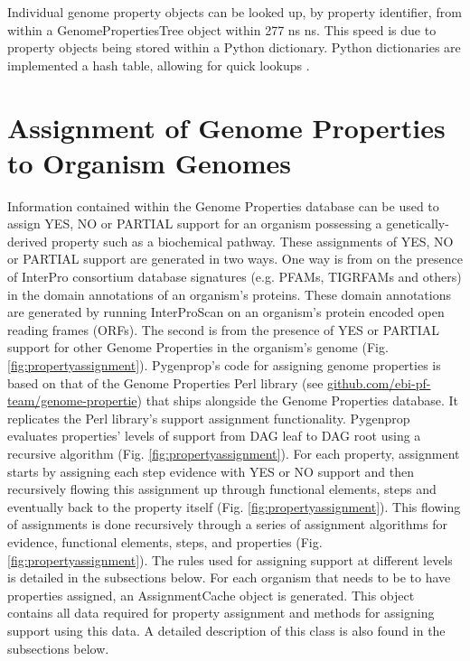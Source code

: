 Individual genome property objects can be looked up, by property identifier, from within a GenomePropertiesTree object within 277 ns  ns. This speed is due to property objects being stored within a Python dictionary. Python dictionaries are implemented a hash table, allowing for quick lookups \cite{van1995python}.

\section{Assignment of Genome Properties to Organism Genomes}

Information contained within the Genome Properties database can be used to assign YES, NO or PARTIAL support for an organism possessing a genetically-derived property such as a biochemical pathway. These assignments of YES, NO or PARTIAL support are generated in two ways. One way is from on the presence of InterPro consortium database signatures (e.g. PFAMs, TIGRFAMs and others) in the domain annotations of an organism's proteins. These domain annotations are generated by running InterProScan \cite{jones2014interproscan} on an organism's protein encoded open reading frames (ORFs). The second is from the presence of YES or PARTIAL support for other Genome Properties in the organism's genome (Fig. \ref{fig:propertyassignment}). Pygenprop's code for assigning genome properties is based on that of the Genome Properties Perl library (see \href{github.com/ebi-pf-team/genome-properties}{github.com/ebi-pf-team/genome-propertie}) that ships alongside the Genome Properties database. It replicates the Perl library's support assignment functionality. Pygenprop evaluates properties' levels of support from DAG leaf to DAG root using a recursive algorithm (Fig. \ref{fig:propertyassignment}). For each property, assignment starts by assigning each step evidence with YES or NO support and then recursively flowing this assignment up through functional elements, steps and eventually back to the property itself (Fig. \ref{fig:propertyassignment}). This flowing of assignments is done recursively through a series of assignment algorithms for evidence, functional elements, steps, and properties (Fig. \ref{fig:propertyassignment}). The rules used for assigning support at different levels is detailed in the subsections below. For each organism that needs to be to have properties assigned, an AssignmentCache object is generated. This object contains all data required for property assignment and methods for assigning support using this data. A detailed description of this class is also found in the subsections below.

